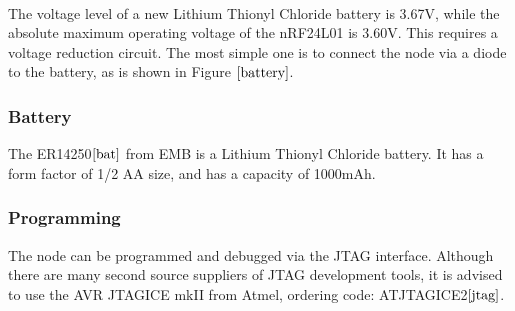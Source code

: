 \documentclass[a4paper,10pt]{report}
\begin{document}
\paragraph*{}
The voltage level of a new Lithium Thionyl Chloride battery is 3.67V, while the absolute maximum operating voltage of the nRF24L01 is 3.60V. This requires a voltage reduction circuit. The most simple one is to connect the node via a diode to the battery, as is shown in Figure $\ref{battery}$.
\subsubsection{Battery}
The ER14250$\cite{bat}$ from EMB is a Lithium Thionyl Chloride battery. It has a form factor of 1/2 AA size, and has a capacity of 1000mAh.
\subsubsection{Programming}
The node can be programmed and debugged via the JTAG interface. Although there are many second source suppliers of JTAG development tools, it is advised to use the AVR JTAGICE mkII from Atmel, ordering code: ATJTAGICE2$\cite{jtag}$.
\end{document}

